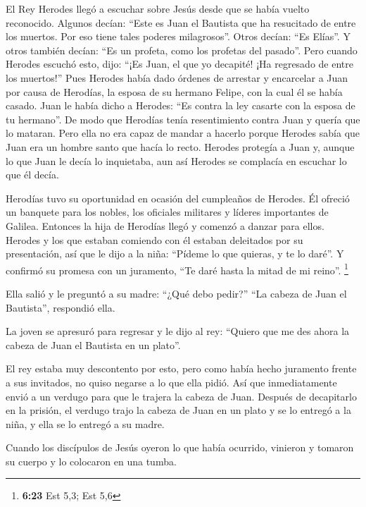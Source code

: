  El Rey Herodes llegó a escuchar sobre Jesús desde que se
había vuelto reconocido. Algunos decían: ``Este es Juan el Bautista que
ha resucitado de entre los muertos. Por eso tiene tales poderes
milagrosos''.  Otros decían: ``Es Elías''. Y otros
también decían: ``Es un profeta, como los profetas del pasado''.
 Pero cuando Herodes escuchó esto, dijo: ``¡Es Juan, el
que yo decapité! ¡Ha regresado de entre los muertos!'' 
Pues Herodes había dado órdenes de arrestar y encarcelar a Juan por
causa de Herodías, la esposa de su hermano Felipe, con la cual él se
había casado.  Juan le había dicho a Herodes: ``Es contra
la ley casarte con la esposa de tu hermano''.  De modo
que Herodías tenía resentimiento contra Juan y quería que lo mataran.
Pero ella no era capaz de mandar a hacerlo  porque
Herodes sabía que Juan era un hombre santo que hacía lo recto. Herodes
protegía a Juan y, aunque lo que Juan le decía lo inquietaba, aun así
Herodes se complacía en escuchar lo que él decía.

 Herodías tuvo su oportunidad en ocasión del cumpleaños
de Herodes. Él ofreció un banquete para los nobles, los oficiales
militares y líderes importantes de Galilea.  Entonces la
hija de Herodías llegó y comenzó a danzar para ellos. Herodes y los que
estaban comiendo con él estaban deleitados por su presentación, así que
le dijo a la niña:  ``Pídeme lo que quieras, y te lo
daré''. Y confirmó su promesa con un juramento, ``Te daré hasta la mitad
de mi reino''. \footnote{\textbf{6:23} Est 5,3; Est 5,6}

 Ella salió y le preguntó a su madre: ``¿Qué debo
pedir?'' ``La cabeza de Juan el Bautista'', respondió ella.

 La joven se apresuró para regresar y le dijo al rey:
``Quiero que me des ahora la cabeza de Juan el Bautista en un plato''.

 El rey estaba muy descontento por esto, pero como había
hecho juramento frente a sus invitados, no quiso negarse a lo que ella
pidió.  Así que inmediatamente envió a un verdugo para
que le trajera la cabeza de Juan. Después de decapitarlo en la prisión,
 el verdugo trajo la cabeza de Juan en un plato y se lo
entregó a la niña, y ella se lo entregó a su madre.

 Cuando los discípulos de Jesús oyeron lo que había
ocurrido, vinieron y tomaron su cuerpo y lo colocaron en una tumba.

